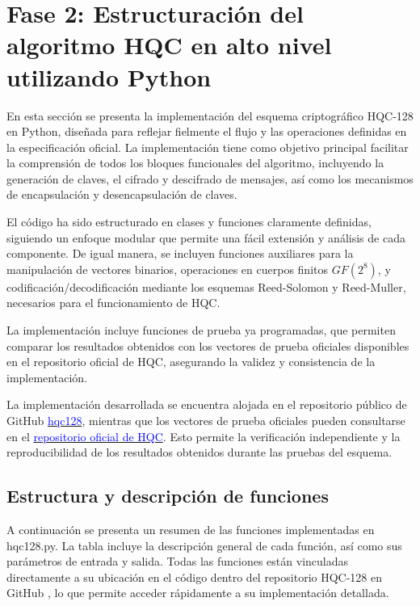 \section{Fase 2: Estructuración del algoritmo HQC en alto nivel utilizando Python}

En esta sección se presenta la implementación del esquema criptográfico HQC-128 en Python, diseñada para reflejar fielmente el flujo y las operaciones definidas en la especificación oficial. La implementación tiene como objetivo principal facilitar la comprensión de todos los bloques funcionales del algoritmo, incluyendo la generación de claves, el cifrado y descifrado de mensajes, así como los mecanismos de encapsulación y desencapsulación de claves.

El código ha sido estructurado en clases y funciones claramente definidas, siguiendo un enfoque modular que permite una fácil extensión y análisis de cada componente. De igual manera, se incluyen funciones auxiliares para la manipulación de vectores binarios, operaciones en cuerpos finitos $GF(2^8)$, y codificación/decodificación mediante los esquemas Reed-Solomon y Reed-Muller, necesarios para el funcionamiento de HQC.

La implementación incluye funciones de prueba ya programadas, que permiten comparar los resultados obtenidos con los vectores de prueba oficiales disponibles en el repositorio oficial de HQC, asegurando la validez y consistencia de la implementación.

La implementación desarrollada se encuentra alojada en el repositorio público de GitHub \href{https://github.com/camilo-home/hqc128.git}{\textcolor{blue}{hqc128}}, mientras que los vectores de prueba oficiales pueden consultarse en el \href{https://gitlab.com/pqc-hqc/hqc/}{\textcolor{blue}{repositorio oficial de HQC}}. Esto permite la verificación independiente y la reproducibilidad de los resultados obtenidos durante las pruebas del esquema.

\subsection{Estructura y descripción de funciones}
A continuación se presenta un resumen de las funciones implementadas en hqc128.py. La tabla incluye la descripción general de cada función, así como sus parámetros de entrada y salida. Todas las funciones están vinculadas directamente a su ubicación en el código dentro del repositorio HQC-128 en GitHub
, lo que permite acceder rápidamente a su implementación detallada.


